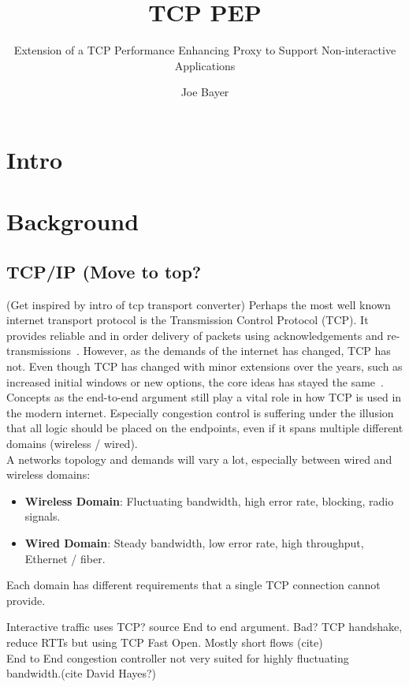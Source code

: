 \documentclass[a4paper,english, 11pt]{report}
\author{Joe Bayer}
\title{TCP PEP}
\subtitle{Extension of a TCP Performance Enhancing Proxy to
Support Non-interactive Applications}
\begin{document}
\uiomasterfp[program={Informatics: Programming and System Architecture}, supervisors={Michael Welzl\and Kristjon Ciko}]

\tableofcontents

\chapter{Intro}

\chapter{Background}

\section{TCP/IP (Move to top?}
(Get inspired by intro of tcp transport converter)
Perhaps the most well known internet transport protocol is the Transmission Control Protocol (TCP). It provides reliable and in order delivery of packets using acknowledgements and re-transmissions~\cite{Eddy_2022}. However, as the demands of the internet has changed, TCP has not. Even though TCP has changed with minor extensions over the years, such as increased initial windows or new options, the core ideas has stayed the same~\cite{rfc8803}. Concepts as the end-to-end argument still play a vital role in how TCP is used in the modern internet. Especially congestion control is suffering under the illusion that all logic should be placed on the endpoints, even if it spans multiple different domains (wireless / wired).\\

A networks topology and demands will vary a lot, especially between wired and wireless domains:
\begin{itemize}
  \item \textbf{Wireless Domain}: Fluctuating bandwidth, high error rate, blocking, radio signals.
  \item \textbf{Wired Domain}: Steady bandwidth, low error rate, high throughput, Ethernet / fiber.
\end{itemize}

Each domain has different requirements that a single TCP connection cannot provide. 

Interactive traffic uses TCP? {source}
End to end argument. Bad?
TCP handshake, reduce RTTs but using TCP Fast Open. Mostly short flows (cite)
\\
End to End congestion controller not very suited for highly fluctuating bandwidth.(cite David Hayes?)
\end{document}
